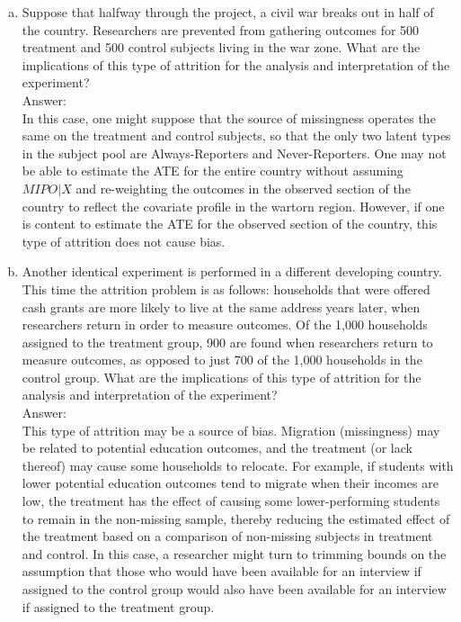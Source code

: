 \documentclass[11pt,notitlepage]{article}\usepackage[]{graphicx}\usepackage[]{color}
\begin{document}
\begin{enumerate}[a)]
\item Suppose that halfway through the project, a civil war breaks out in half of the country. Researchers are prevented from gathering outcomes for 500 treatment and 500 control subjects living in the war zone. What are the implications of this type of attrition for the analysis and interpretation of the experiment?\\
Answer:\\
In this case, one might suppose that the source of missingness operates the same on the treatment and control subjects, so that the only two latent types in the subject pool are Always-Reporters and Never-Reporters. One may not be able to estimate the ATE for the entire country without assuming $MIPO|X$ and re-weighting the outcomes in the observed section of the country to reflect the covariate profile in the wartorn region. However, if one is content to estimate the ATE for the observed section of the country, this type of attrition does not cause bias.

\item Another identical experiment is performed in a different developing country. This time the attrition problem is as follows: households that were offered cash grants are more likely to live at the same address years later, when researchers return in order to measure outcomes. Of the 1,000 households assigned to the treatment group, 900 are found when researchers return to measure outcomes, as opposed to just 700 of the 1,000 households in the control group. What are the implications of this type of attrition for the analysis and interpretation of the experiment?\\
Answer:\\
This type of attrition may be a source of bias. Migration (missingness) may be related to potential education outcomes, and the treatment (or lack thereof) may cause some households to relocate. For example, if students with lower potential education outcomes tend to migrate when their incomes are low, the treatment has the effect of causing some lower-performing students to remain in the non-missing sample, thereby reducing the estimated effect of the treatment based on a comparison of non-missing subjects in treatment and control. In this case, a researcher might turn to trimming bounds on the assumption that those who would have been available for an interview if assigned to the control group would also have been available for an interview if assigned to the treatment group.
\end{enumerate}
\end{document}

